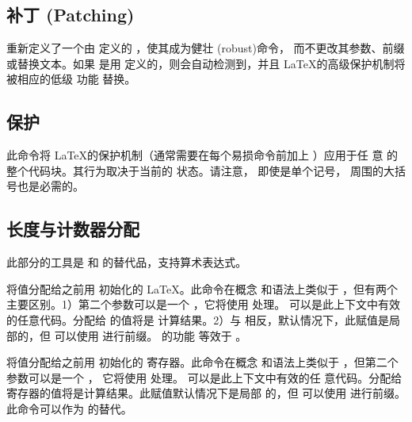\documentclass{ltxdockit}[2010/09/26]
\begin{document}
\subsection{补丁 (Patching)}
\label{use:pat}

\begin{ltxsyntax}


  重新定义了一个由  定义的 ，使其成为健壮 (robust)命令，
  而不更改其参数、前缀或替换文本。如果  是用 
  定义的，则会自动检测到，并且 \LaTeX 的高级保护机制将被相应的低级 \etex 功能
  替换。

\end{ltxsyntax}

\subsection{保护}
\label{use:pro}

\begin{ltxsyntax}


  此命令将 \LaTeX 的保护机制（通常需要在每个易损命令前加上 ）应用于任
  意  的整个代码块。其行为取决于当前的  状态。请注意，
  即使是单个记号， 周围的大括号也是必需的。

\end{ltxsyntax}

\subsection[长度与计数器]{长度与计数器分配}
\label{use:cal}

此部分的工具是  和  的替代品，支持算术表达式。

\begin{ltxsyntax}


  将值分配给之前用  初始化的 \LaTeX {}。此命令在概念
  和语法上类似于 ，但有两个主要区别。1）第二个参数可以是一个
  ，它将使用  处理。  可以是此上下文中有效的任意代码。分配给  的值将是
  计算结果。2）与  相反，默认情况下，此赋值是局部的，但
   可以使用  进行前缀。  的功能
  等效于 。


  将值分配给之前用  初始化的  寄存器。此命令在概念
  和语法上类似于 ，但第二个参数可以是一个 ，
  它将使用  处理。  可以是此上下文中有效的任
  意代码。分配给  寄存器的值将是计算结果。此赋值默认情况下是局部
  的，但  可以使用  进行前缀。此命令可以作为
   的替代。

\end{ltxsyntax}
\end{document}
